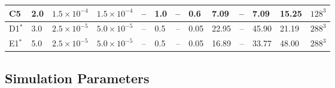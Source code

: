 \documentclass[baaa]{baaa}
\begin{document}
\begin{table*}[t!]
\begin{tabular}{llllclcllclll}
     C5 & 2.0 & $1.5 \times 10^{-4}$ & $1.5 \times 10^{-4}$ & -- & 1.0 & -- & 0.6 & 7.09 & -- & 7.09 & 15.25 & $128^3$\\ \hline\noalign{\smallskip}
     D1$^*$ & 3.0 & $2.5 \times 10^{-5}$ & $5.0 \times 10^{-5}$ & -- & 0.5 & -- & 0.05 & 22.95 & -- & 45.90 & 21.19 & $288^3$\\ \hline\noalign{\smallskip}
     E1$^*$ & 5.0 & $2.5 \times 10^{-5}$ & $5.0 \times 10^{-5}$ & -- & 0.5 & -- & 0.05 & 16.89 & -- & 33.77 & 48.00 & $288^3$\\
     \hline
    \end{tabular}
\end{table*}




\subsection{Simulation Parameters}
\end{document}
